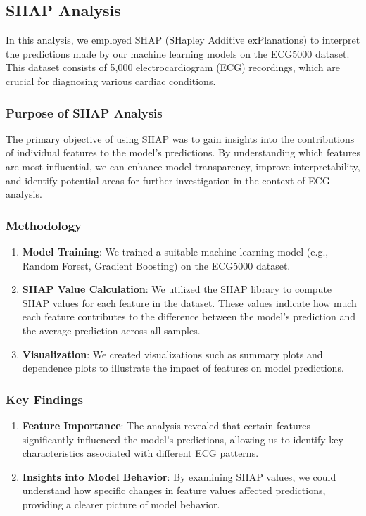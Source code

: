 \documentclass[nonacm,sigconf]{acmart}
\begin{document}
\subsection{SHAP Analysis}
In this analysis, we employed SHAP (SHapley Additive exPlanations) to interpret the predictions made by our machine learning models on the ECG5000 dataset. This dataset consists of 5,000 electrocardiogram (ECG) recordings, which are crucial for diagnosing various cardiac conditions.
\subsubsection{\textbf{Purpose of SHAP Analysis}}
The primary objective of using SHAP was to gain insights into the contributions of individual features to the model's predictions. By understanding which features are most influential, we can enhance model transparency, improve interpretability, and identify potential areas for further investigation in the context of ECG analysis.
\subsubsection{\textbf{
Methodology}}
\begin{enumerate} 
    \item \textbf{Model Training}: We trained a suitable machine learning model (e.g., Random Forest, Gradient Boosting) on the ECG5000 dataset.
    \item \textbf{SHAP Value Calculation}: We utilized the SHAP library to compute SHAP values for each feature in the dataset. These values indicate how much each feature contributes to the difference between the model's prediction and the average prediction across all samples.
    \item \textbf{Visualization}: We created visualizations such as summary plots and dependence plots to illustrate the impact of features on model predictions.
\end{enumerate}
\subsubsection{\textbf{Key Findings}}

\begin{enumerate}
    \item \textbf{
    Feature Importance}: The analysis revealed that certain features significantly influenced the model's predictions, allowing us to identify key characteristics associated with different ECG patterns.
    
    \item \textbf{Insights into Model Behavior}: By examining SHAP values, we could understand how specific changes in feature values affected predictions, providing a clearer picture of model behavior.
    
\end{enumerate}
\end{document}
